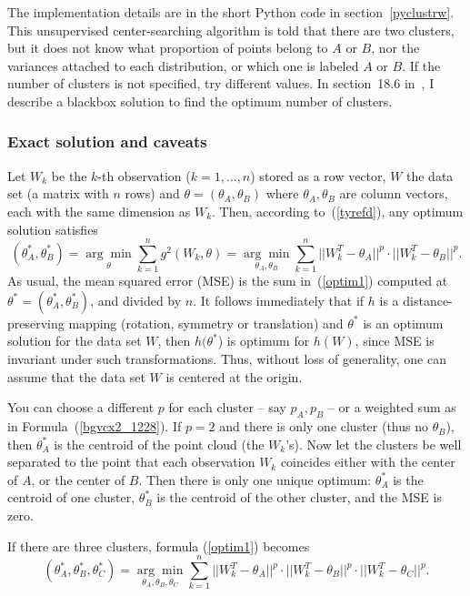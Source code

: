 \documentclass[oneside,10pt]{book}
\begin{document}
The implementation details are in the short
 Python code in section~\ref{pyclustrw}.  This unsupervised center-searching algorithm is told that there are two clusters, but it does not know what proportion of points belong to $A$ or $B$, nor the variances attached to
 each distribution, or which one is labeled $A$ or $B$. If the number of clusters is not specified, try different values. In section~18.6 in~\cite{vgelsevier}, I describe
 a blackbox solution to find the optimum number of clusters.

\subsubsection{Exact solution and caveats}\label{exact5}

Let $W_k$ be the $k$-th observation ($k=1,\dots,n$) stored as a row vector, $W$ the data set (a matrix with $n$ rows) and $\theta=(\theta_A,\theta_B)$ where $\theta_A,\theta_B$ are column vectors, each with the same dimension as $W_k$. Then, according to~(\ref{tyrefd}),  any optimum solution satisfies
\begin{equation}
(\theta_A^*,\theta_B^*) = \underset{\theta}{\arg\min} \sum_{k=1}^n g^2(W_k,\theta)= \underset{\theta_A,\theta_B}{\arg\min} \sum_{k=1}^n ||W_k^T-\theta_A||^{p} \cdot ||W_k^T-\theta_B||^{p}. \label{optim1}
\end{equation}
 As usual, the \textcolor{index}{mean squared error} (MSE) is the sum in~(\ref{optim1}) computed at $\theta^*=(\theta_A^*,\theta_B^*)$, and divided by $n$.
It follows immediately that if $h$ is a distance-preserving mapping (rotation, symmetry or translation) and $\theta^*$ is an optimum solution for the data set $W$, then $h(\theta^*$) is optimum for $h(W)$, since MSE is invariant under such transformations. Thus, without loss of generality, one can assume that the data set $W$ is centered at the origin.

You can choose a different $p$ for each cluster -- say $p_A,p_B$ -- or a weighted sum as in Formula~(\ref{bgvcx2_1228}).
If $p=2$ and there is only one cluster (thus no $\theta_B$), then $\theta_A^*$ is the centroid of the point
 cloud (the $W_k$'s). Now let the clusters be well separated to the point that each observation $W_k$ coincides either with the center of $A$, or the center of $B$.
Then there is only one unique optimum: $\theta_A^*$ is the centroid of one cluster, $\theta_B^*$ is the centroid of the other cluster, and the MSE is zero.

If there are three clusters, formula (\ref{optim1})  becomes
\begin{equation}
(\theta_A^*,\theta_B^*,\theta_C^*) = \underset{\theta_A,\theta_B,\theta_C}{\arg\min} \sum_{k=1}^n ||W_k^T-\theta_A||^{p} \cdot ||W_k^T-\theta_B||^{p} \cdot ||W_k^T-\theta_C||^{p}. \label{optim2}
\end{equation}
\end{document}
